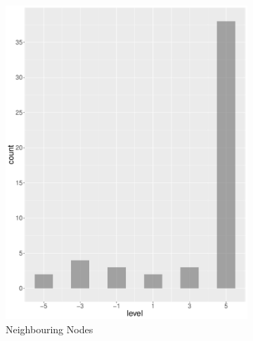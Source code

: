 \begin{figure}
    \centering
    \begin{subfigure}[b]{0.4\textwidth}
        \includegraphics[width=\textwidth]{plots/tennis/hist_level_nn}
        \caption{Neighbouring Nodes}
        \label{fig:hist_level_tennis_nn}
    \end{subfigure}
    ~
    \begin{subfigure}[b]{0.4\textwidth}

\end{subfigure}
\end{figure}

